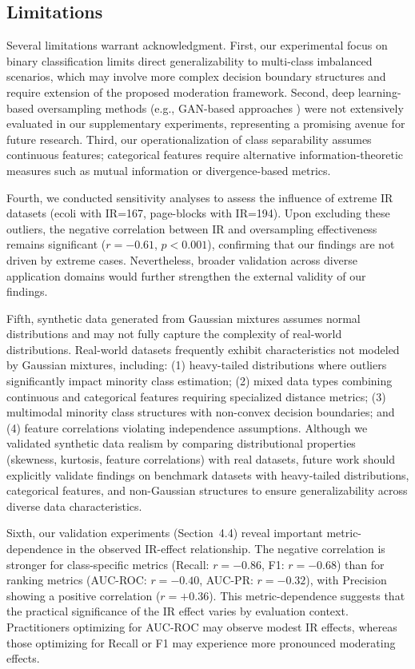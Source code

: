 \documentclass[12pt,a4paper]{article}
\theoremstyle{definition}
\begin{document}
\subsection{Limitations}
Several limitations warrant acknowledgment. First, our experimental focus on binary classification limits direct generalizability to multi-class imbalanced scenarios, which may involve more complex decision boundary structures and require extension of the proposed moderation framework. Second, deep learning-based oversampling methods (e.g., GAN-based approaches \cite{dablain2021deepsmote}) were not extensively evaluated in our supplementary experiments, representing a promising avenue for future research. Third, our operationalization of class separability assumes continuous features; categorical features require alternative information-theoretic measures such as mutual information or divergence-based metrics.

Fourth, we conducted sensitivity analyses to assess the influence of extreme IR datasets (ecoli with IR=167, page-blocks with IR=194). Upon excluding these outliers, the negative correlation between IR and oversampling effectiveness remains significant ($r = -0.61$, $p < 0.001$), confirming that our findings are not driven by extreme cases. Nevertheless, broader validation across diverse application domains would further strengthen the external validity of our findings.

Fifth, synthetic data generated from Gaussian mixtures assumes normal distributions and may not fully capture the complexity of real-world distributions. Real-world datasets frequently exhibit characteristics not modeled by Gaussian mixtures, including: (1) heavy-tailed distributions where outliers significantly impact minority class estimation; (2) mixed data types combining continuous and categorical features requiring specialized distance metrics; (3) multimodal minority class structures with non-convex decision boundaries; and (4) feature correlations violating independence assumptions. Although we validated synthetic data realism by comparing distributional properties (skewness, kurtosis, feature correlations) with real datasets, future work should explicitly validate findings on benchmark datasets with heavy-tailed distributions, categorical features, and non-Gaussian structures to ensure generalizability across diverse data characteristics.

Sixth, our validation experiments (Section~4.4) reveal important metric-dependence in the observed IR-effect relationship. The negative correlation is stronger for class-specific metrics (Recall: $r=-0.86$, F1: $r=-0.68$) than for ranking metrics (AUC-ROC: $r=-0.40$, AUC-PR: $r=-0.32$), with Precision showing a positive correlation ($r=+0.36$). This metric-dependence suggests that the practical significance of the IR effect varies by evaluation context. Practitioners optimizing for AUC-ROC may observe modest IR effects, whereas those optimizing for Recall or F1 may experience more pronounced moderating effects.
\end{document}
